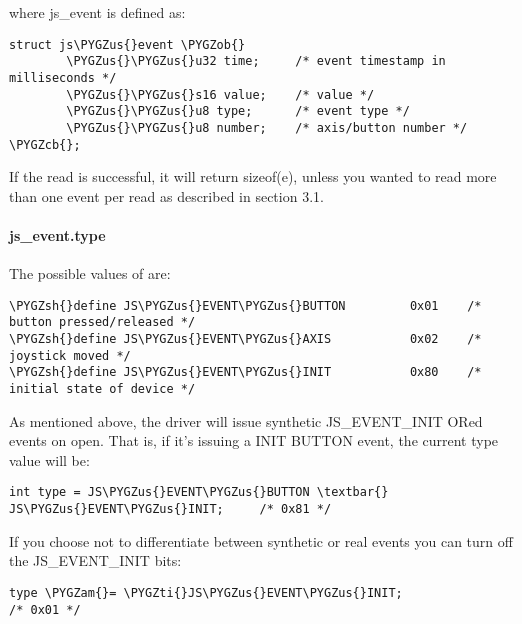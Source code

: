\documentclass[a4paper,8pt,english]{sphinxmanual}
\def\PYGZus{\char`\_}
\def\PYGZob{\char`\{}
\def\PYGZcb{\char`\}}
\def\PYGZam{\char`\&}
\def\PYGZsh{\char`\#}
\def\PYGZti{\char`\~}
\begin{document}
where js\_event is defined as:

\begin{Verbatim}[commandchars=\\\{\}]
struct js\PYGZus{}event \PYGZob{}
        \PYGZus{}\PYGZus{}u32 time;     /* event timestamp in milliseconds */
        \PYGZus{}\PYGZus{}s16 value;    /* value */
        \PYGZus{}\PYGZus{}u8 type;      /* event type */
        \PYGZus{}\PYGZus{}u8 number;    /* axis/button number */
\PYGZcb{};
\end{Verbatim}

If the read is successful, it will return sizeof(e), unless you wanted to read
more than one event per read as described in section 3.1.


\paragraph{js\_event.type}
\label{input/joydev/joystick-api:js-event-type}
The possible values of  are:

\begin{Verbatim}[commandchars=\\\{\}]
\PYGZsh{}define JS\PYGZus{}EVENT\PYGZus{}BUTTON         0x01    /* button pressed/released */
\PYGZsh{}define JS\PYGZus{}EVENT\PYGZus{}AXIS           0x02    /* joystick moved */
\PYGZsh{}define JS\PYGZus{}EVENT\PYGZus{}INIT           0x80    /* initial state of device */
\end{Verbatim}

As mentioned above, the driver will issue synthetic JS\_EVENT\_INIT ORed
events on open. That is, if it's issuing a INIT BUTTON event, the
current type value will be:

\begin{Verbatim}[commandchars=\\\{\}]
int type = JS\PYGZus{}EVENT\PYGZus{}BUTTON \textbar{} JS\PYGZus{}EVENT\PYGZus{}INIT;     /* 0x81 */
\end{Verbatim}

If you choose not to differentiate between synthetic or real events
you can turn off the JS\_EVENT\_INIT bits:

\begin{Verbatim}[commandchars=\\\{\}]
type \PYGZam{}= \PYGZti{}JS\PYGZus{}EVENT\PYGZus{}INIT;                         /* 0x01 */
\end{Verbatim}
\end{document}
